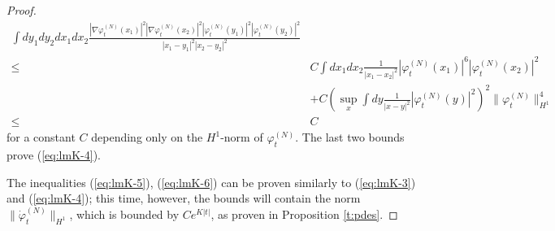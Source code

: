 \documentclass[11pt,a4paper]{article}
\begin{document}
\begin{proof}
\[\begin{split}
\int dy_1 dy_2 dx_1 dx_2  \frac{ |\nabla\varphi_t^{(N)} (x_1)|^2 |\nabla \varphi_t^{(N)} (x_2)|^2 
|\varphi_t^{(N)} (y_1)|^2 |\varphi_t^{(N)} (y_2)|^2}{|x_1 - y_1|^2 |x_2 - y_2|^2}  \\ \leq \; &C \int dx_1 dx_2 \frac{1}{|x_1 - x_2|^2} |\varphi_t^{(N)} (x_1)|^6 |\varphi_t^{(N)} (x_2)|^2 \\ &+ C \left( \sup_x \int dy \frac{1}{|x-y|^2} |\varphi_t^{(N)} (y)|^2 \right)^2 \| \varphi_t^{(N)} \|_{H^1}^4 \\ \leq \; & C 
\end{split} \]
for a constant $C$ depending only on the $H^1$-norm of $\varphi_t^{(N)}$. The last two bounds prove (\ref{eq:lmK-4}).

The inequalities (\ref{eq:lmK-5}), (\ref{eq:lmK-6}) can be proven similarly to (\ref{eq:lmK-3}) and (\ref{eq:lmK-4}); this time, however, the bounds will contain the norm $\| \dot{\varphi}_t^{(N)} \|_{H^1}$, which is bounded by $C e^{K |t|}$, as proven in Proposition \ref{t:pdes}.
\end{proof}
\end{document}
